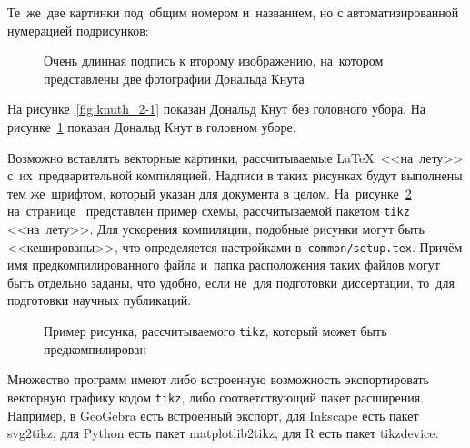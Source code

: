 Те~же~две картинки под~общим номером и~названием,
но с автоматизированной нумерацией подрисунков:
\begin{figure}[ht]
    \caption[Этот текст попадает в названия рисунков в списке рисунков]{Очень
    длинная подпись к второму изображению, на~котором представлены две
    фотографии Дональда Кнута}\label{fig:knuth_2}
\end{figure}

На рисунке~\cref{fig:knuth_2-1} показан Дональд Кнут без головного убора.
На рисунке~\cref{fig:knuth_2}
показан Дональд Кнут в головном уборе.

Возможно вставлять векторные картинки, рассчитываемые \LaTeX\ <<на~лету>>
с~их~предварительной компиляцией. Надписи в таких рисунках будут выполнены
тем же~шрифтом, который указан для документа в целом.
На~рисунке~\cref{fig:tikz_example} на~странице~\pageref{fig:tikz_example}
представлен пример схемы, рассчитываемой пакетом \verb|tikz| <<на~лету>>.
Для ускорения компиляции, подобные рисунки могут быть <<кешированы>>, что
определяется настройками в~\verb|common/setup.tex|.
Причём имя предкомпилированного
файла и~папка расположения таких файлов могут быть отдельно заданы,
что удобно, если не~для подготовки диссертации,
то~для подготовки научных публикаций.
\begin{figure}[ht]
    \legend{}
    \caption[Пример \texttt{tikz} схемы]{Пример рисунка, рассчитываемого
        \texttt{tikz}, который может быть предкомпилирован}\label{fig:tikz_example}
\end{figure}

Множество программ имеют либо встроенную возможность экспортировать векторную
графику кодом \verb|tikz|, либо соответствующий пакет расширения.
Например, в GeoGebra есть встроенный экспорт,
для Inkscape есть пакет svg2tikz,
для Python есть пакет matplotlib2tikz,
для R есть пакет tikzdevice.

